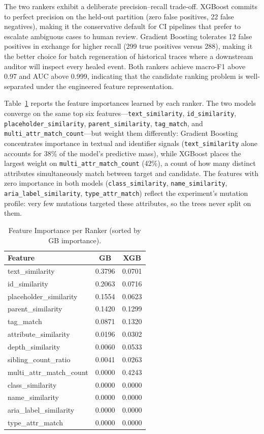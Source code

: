 \documentclass[conference]{IEEEtran}
\begin{document}
The two rankers exhibit a deliberate precision--recall trade-off. XGBoost commits to perfect precision on the held-out partition (zero false positives, 22 false negatives), making it the conservative default for CI pipelines that prefer to escalate ambiguous cases to human review. Gradient Boosting tolerates 12 false positives in exchange for higher recall (299 true positives versus 288), making it the better choice for batch regeneration of historical traces where a downstream auditor will inspect every healed event. Both rankers achieve macro-F1 above 0.97 and AUC above 0.999, indicating that the candidate ranking problem is well-separated under the engineered feature representation.

Table~\ref{tab:feature_importance} reports the feature importances learned by each ranker. The two models converge on the same top six features---\texttt{text\_similarity}, \texttt{id\_similarity}, \texttt{placeholder\_similarity}, \texttt{parent\_similarity}, \texttt{tag\_match}, and \texttt{multi\_attr\_match\_count}---but weight them differently: Gradient Boosting concentrates importance in textual and identifier signals (\texttt{text\_similarity} alone accounts for 38\% of the model's predictive mass), while XGBoost places the largest weight on \texttt{multi\_attr\_match\_count} (42\%), a count of how many distinct attributes simultaneously match between target and candidate. The features with zero importance in both models (\texttt{class\_similarity}, \texttt{name\_similarity}, \texttt{aria\_label\_similarity}, \texttt{type\_attr\_match}) reflect the experiment's mutation profile: very few mutations targeted these attributes, so the trees never split on them.

\begin{table}[H]
\centering
\caption{Feature Importance per Ranker (sorted by GB importance).}
\label{tab:feature_importance}
\begin{tabular}{lcc}
\toprule
\textbf{Feature} & \textbf{GB} & \textbf{XGB} \\
\midrule
text\_similarity         & 0.3796 & 0.0701 \\
id\_similarity           & 0.2063 & 0.0716 \\
placeholder\_similarity  & 0.1554 & 0.0623 \\
parent\_similarity       & 0.1420 & 0.1299 \\
tag\_match               & 0.0871 & 0.1320 \\
attribute\_similarity    & 0.0196 & 0.0302 \\
depth\_similarity        & 0.0060 & 0.0533 \\
sibling\_count\_ratio    & 0.0041 & 0.0263 \\
multi\_attr\_match\_count & 0.0000 & 0.4243 \\
class\_similarity        & 0.0000 & 0.0000 \\
name\_similarity         & 0.0000 & 0.0000 \\
aria\_label\_similarity  & 0.0000 & 0.0000 \\
type\_attr\_match        & 0.0000 & 0.0000 \\
\bottomrule
\end{tabular}
\end{table}
\end{document}
